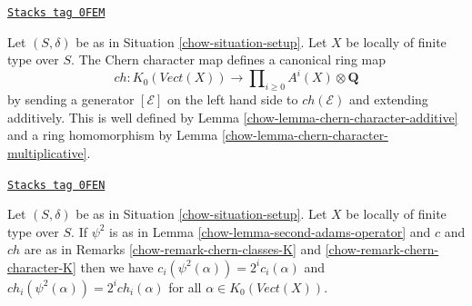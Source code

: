 \begin{remark}
\label{chow-remark-chern-character-K}
\href{https://stacks.math.columbia.edu/tag/0FEM}{\texttt{Stacks tag 0FEM}}

Let $(S, \delta)$ be as in Situation \ref{chow-situation-setup}.
Let $X$ be locally of finite type over $S$. The Chern character
map defines a canonical ring map
$$
ch : K_0(\textit{Vect}(X)) \longrightarrow
\prod\nolimits_{i \geq 0} A^i(X) \otimes \mathbf{Q}
$$
by sending a generator $[\mathcal{E}]$ on the left hand side to
$ch(\mathcal{E})$ and extending additively. This is well defined
by Lemma \ref{chow-lemma-chern-character-additive} and a ring homomorphism by
Lemma \ref{chow-lemma-chern-character-multiplicative}.
\end{remark}

\begin{lemma}
\label{chow-lemma-adams-and-chern}
\href{https://stacks.math.columbia.edu/tag/0FEN}{\texttt{Stacks tag 0FEN}}

Let $(S, \delta)$ be as in Situation \ref{chow-situation-setup}.
Let $X$ be locally of finite type over $S$. If $\psi^2$ is
as in Lemma \ref{chow-lemma-second-adams-operator} and $c$ and $ch$ are as in
Remarks \ref{chow-remark-chern-classes-K} and \ref{chow-remark-chern-character-K}
then we have $c_i(\psi^2(\alpha)) = 2^i c_i(\alpha)$ and
$ch_i(\psi^2(\alpha)) = 2^i ch_i(\alpha)$
for all $\alpha \in K_0(\textit{Vect}(X))$.
\end{lemma}


